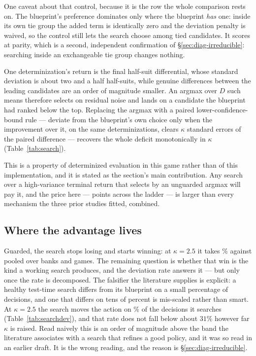 One caveat about that control, because it is the row the whole comparison rests on. The blueprint's
preference dominates only where the blueprint \emph{has} one: inside its own tie group the added
term is identically zero and the deviation penalty is waived, so the control still lets the search
choose among tied candidates. It scores at parity, which is a second, independent confirmation of
\S\ref{sec:diag-irreducible}: searching inside an exchangeable tie group changes nothing.

One determinization's return is the final half-suit differential, whose standard deviation is about
two and a half half-suits, while genuine differences between the leading candidates are an order of
magnitude smaller. An argmax over $D$ such means therefore selects on residual noise and lands on a
candidate the blueprint had ranked below the top. Replacing the argmax with a paired
lower-confidence-bound rule --- deviate from the blueprint's own choice only when the improvement
over it, on the same determinizations, clears $\kappa$ standard errors of the paired difference ---
recovers the whole deficit monotonically in $\kappa$ (Table~\ref{tab:search}).

\begin{table}[t]\centering
\caption{The deviation-threshold ladder, six rotations, held-out bank. The first row is the control
that forces the blueprint to decide. The range across the ladder is \vsixSearchSpread{} points.}
\label{tab:search}

\end{table}

This is a property of determinized evaluation in this game rather than of this implementation, and
it is stated as the section's main contribution. Any search over a high-variance terminal return
that selects by an unguarded argmax will pay it, and the price here --- \vsixSearchSpread{} points
across the ladder --- is larger than every mechanism the three prior studies fitted, combined.

\subsection{Where the advantage lives}
\label{sec:search-falsifier}

Guarded, the search stops losing and starts winning: at $\kappa = 2.5$ it takes
\vsixSearchPooled\% against \vfive{} pooled over \vsixSearchPooledBanks{} banks and
\vsixSearchPooledN{} games. The remaining
question is whether that win is the kind a working search produces, and the deviation rate answers
it --- but only once the rate is decomposed. The falsifier the literature supplies is explicit: a healthy test-time search differs from its
blueprint on a small percentage of decisions, and one that differs on tens of percent is mis-scaled
rather than smart. At $\kappa = 2.5$ the search moves the action on \vsixSearchDevTwoFive\% of the decisions it
searches (Table~\ref{tab:searchdev}), and that rate does not fall below about $31\%$ however far
$\kappa$ is raised. Read naively this is an order of magnitude above the band the literature
associates with a search that refines a good policy, and it was so read in an earlier draft. It is
the wrong reading, and the reason is \S\ref{sec:diag-irreducible}.

